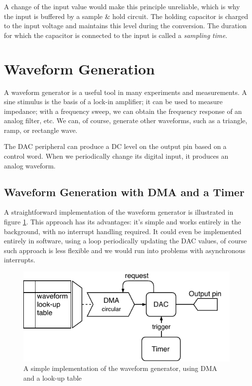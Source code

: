 A change of the input value would make this principle unreliable, which is why the input is buffered by a sample \& hold circuit. The holding capacitor is charged to the input voltage and maintains this level during the conversion. The duration for which the capacitor is connected to the input is called a \textit{sampling time}.

\section{Waveform Generation} \label{sec:theory-dac}

A waveform generator is a useful tool in many experiments and measurements. A sine stimulus is the basis of a lock-in amplifier; it can be used to measure impedance; with a frequency sweep, we can obtain the frequency response of an analog filter, etc. We can, of course, generate other waveforms, such as a triangle, ramp, or rectangle wave.

The \gls{DAC} peripheral can produce a \gls{DC} level on the output pin based on a control word. When we periodically change its digital input, it produces an analog waveform.

\subsection{Waveform Generation with DMA and a Timer} \label{sec:theory-dac-simple}

A straightforward implementation of the waveform generator is illustrated in figure \ref{fig:wavegen-naive}. This approach has its advantages: it's simple and works entirely in the background, with no interrupt handling required. It could even be implemented entirely in software, using a loop periodically updating the \gls{DAC} values, of course such approach is less flexible and we would run into problems with asynchronous interrupts.

\begin{figure}[h]
	\centering
	\includegraphics[scale=1.1] {img/wavegen-naive.pdf}
	\caption[A simple implementation of the waveform generator]{\label{fig:wavegen-naive}A simple implementation of the waveform generator, using DMA and a look-up table}
\end{figure}

